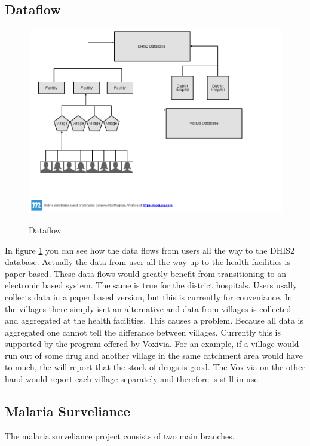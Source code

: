 \subsection{Dataflow}
\begin{figure}
\centering
\includegraphics[width=12cm]{empirical/images/dataflow}
\label{dataflow}
\caption{Dataflow}
\end{figure}
In figure \ref{dataflow} you can see how the data flows from users all the way to the DHIS2 database. Actually the data from user all the way up to the health facilities is paper based.
These data flows would greatly benefit from transitioning to an electronic based system. The same is true for the district hospitals. Users usally collects data in a paper based version, but this is currently for conveniance. In the villages there simply isnt an alternative and data from villages is collected and aggregated at the health facilities. This causes a problem. Because all data is aggregated one cannot tell the differance between villages. Currently this is supported by the program offered by Voxivia. For an example, if a village would run out of some drug and another village in the same catchment area would have to much, the will report that the stock of drugs is good. The Voxivia on the other hand would report each village separately and therefore is still in use.
\subsection{Malaria Surveliance}
The malaria surveliance project consists of two main branches. 
